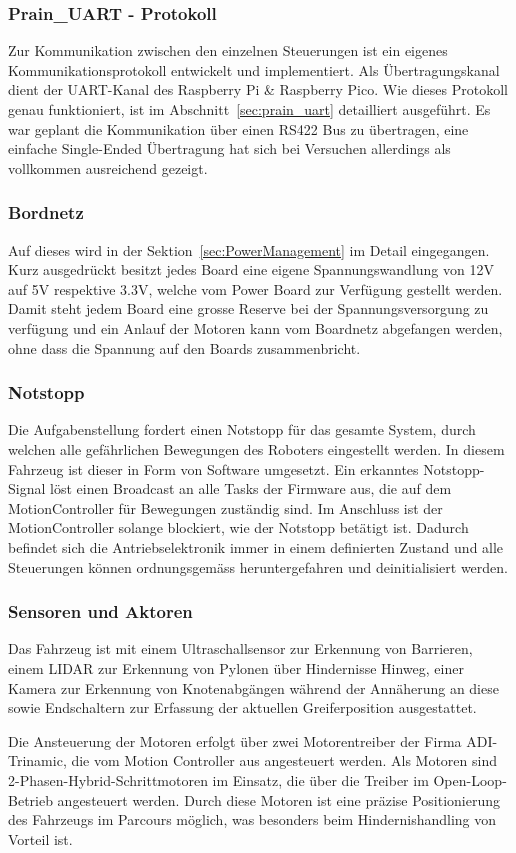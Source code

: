 \documentclass[main.tex]{subfiles} %
\begin{document}
\subsubsection{Prain\_UART - Protokoll}

Zur Kommunikation zwischen den einzelnen Steuerungen ist ein eigenes
Kommunikationsprotokoll entwickelt und implementiert. Als Übertragungskanal
dient der UART-Kanal des Raspberry Pi \& Raspberry Pico. Wie dieses Protokoll
genau funktioniert, ist im Abschnitt~\ref{sec:prain_uart} detailliert
ausgeführt. Es war geplant die Kommunikation über einen RS422 Bus zu
übertragen, eine einfache Single-Ended Übertragung hat sich bei Versuchen
allerdings als vollkommen ausreichend gezeigt.  

\subsubsection*{Bordnetz}

Auf dieses wird in der Sektion~\ref{sec:PowerManagement} im Detail eingegangen.
Kurz ausgedrückt besitzt jedes Board eine eigene Spannungswandlung von 12V auf
5V respektive 3.3V, welche vom Power Board zur Verfügung gestellt werden. Damit
steht jedem Board eine grosse Reserve bei der Spannungsversorgung zu verfügung
und ein Anlauf der Motoren kann vom Boardnetz abgefangen werden, ohne dass die
Spannung auf den Boards zusammenbricht.

\subsubsection*{Notstopp}

Die Aufgabenstellung fordert einen Notstopp für das gesamte System, durch
welchen alle gefährlichen Bewegungen des Roboters eingestellt werden. In diesem
Fahrzeug ist dieser in Form von Software umgesetzt. Ein erkanntes
Notstopp-Signal löst einen Broadcast an alle Tasks der Firmware aus, die auf
dem MotionController für Bewegungen zuständig sind. Im Anschluss ist der
MotionController solange blockiert, wie der Notstopp betätigt ist. Dadurch
befindet sich die Antriebselektronik immer in einem definierten Zustand und
alle Steuerungen können ordnungsgemäss heruntergefahren und deinitialisiert
werden.

\subsubsection*{Sensoren und Aktoren}

Das Fahrzeug ist mit einem Ultraschallsensor zur Erkennung von Barrieren, einem
LIDAR zur Erkennung von Pylonen über Hindernisse Hinweg, einer Kamera zur
Erkennung von Knotenabgängen während der Annäherung an diese sowie Endschaltern
zur Erfassung der aktuellen Greiferposition ausgestattet.

Die Ansteuerung der Motoren erfolgt über zwei Motorentreiber der Firma
ADI-Trinamic, die vom Motion Controller aus angesteuert werden. Als Motoren
sind 2-Phasen-Hybrid-Schrittmotoren im Einsatz, die über die Treiber im
Open-Loop-Betrieb angesteuert werden. Durch diese Motoren ist eine präzise
Positionierung des Fahrzeugs im Parcours möglich, was besonders beim
Hindernishandling von Vorteil ist.
\end{document}
